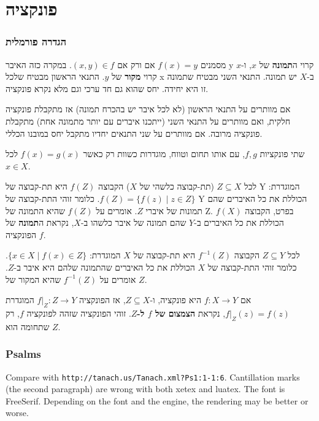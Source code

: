 \documentclass{article}
\begin{document}

\part{פונקציה}

\section{הגדרה פורמלית}

מסמנים $f(x)=y$ אם ורק אם $(x,y) \in f$. במקרה כזה האיבר y קרוי
ה\textbf{תמונה} של $x$, ו-$x$ קרוי \textbf{מקור} של $y$. התנאי הראשון
מבטיח שלכל x ב-$X$ יש תמונה. התנאי השני מבטיח שתמונה זו היא יחידה. יחס
שהוא גם חד ערכי וגם מלא נקרא פונקציה.

אם מוותרים על התנאי הראשון (לא לכל איבר יש בהכרח תמונה) אז מתקבלת
פונקציה חלקית, ואם מוותרים על התנאי השני (ייתכנו איברים עם יותר
מתמונה אחת) מתקבלת פונקציה מרובה. אם מוותרים על שני התנאים יחדיו
מתקבל יחס במובנו הכללי.

שתי פונקציות $f,g$, עם אותו תחום וטווח, מוגדרות כשוות רק כאשר
$f(x)=g(x)$ לכל $x\in X$.

לכל $Z \subseteq X$ (תת-קבוצה כלשהי של $X$) הקבוצה $f(Z)$ היא תת-קבוצה
של Y המוגדרת: $f(Z) = \{f(z) \mid z\in Z \}$. כלומר זוהי התת-קבוצה של Y
הכוללת את כל האיברים שהם תמונות של איברי $Z$. אומרים על $f(Z)$ שהיא
התמונה של Z. בפרט, הקבוצה $f(X)$ הכוללת את כל האיברים ב-$Y$ שהם תמונה
של איבר כלשהו ב-$X$, נקראת ה\textbf{תמונה} של הפונקציה $f$.

לכל $Z \subseteq Y$ הקבוצה $f^{-1}(Z)$ היא תת-קבוצה של $X$ המוגדרת: $\{x
\in X \mid f(x)\in Z\}$. כלומר זוהי התת-קבוצה של $X$ הכוללת את כל האיברים
שהתמונה שלהם היא איבר ב-$Z$. אומרים על $f^{-1}(Z)$ שהיא המקור של $Z$.

אם $f: X \to Y$ היא פונקציה, ו-$Z \subseteq X$, אז הפונקציה $f|_Z : Z
\to Y$ המוגדרת $f|_Z(z) = f(z)$, נקראת \textbf{הצמצום של $f$ ל-$Z$}. זוהי
הפונקציה שזהה לפונקציה $f$, רק שתחומה הוא $Z$.

\section{Psalms}


Compare with \texttt{http://tanach.us/Tanach.xml?Ps1:1-1:6}.
Cantillation marks (the second paragraph) are wrong with both
\textsf{xetex} and \textsf{luatex}. The font is FreeSerif. Depending on
the font and the engine, the rendering may be better or worse.
\end{document}
